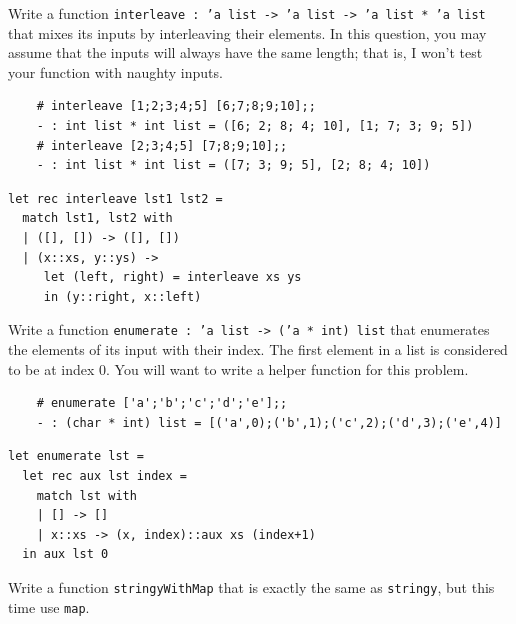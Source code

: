 \documentclass[addpoints]{exam}
\begin{document}
\begin{questions}
  
  \question
  Write a function 
  \texttt{interleave : 'a list -> 'a list -> 'a list * 'a list} 
  that mixes its inputs by interleaving their elements.
  In this question, you may assume that the inputs will always have the same length;
  that is, I won't test your function with naughty inputs.
  \begin{verbatim}
    # interleave [1;2;3;4;5] [6;7;8;9;10];;                                   
    - : int list * int list = ([6; 2; 8; 4; 10], [1; 7; 3; 9; 5])
    # interleave [2;3;4;5] [7;8;9;10];;    
    - : int list * int list = ([7; 3; 9; 5], [2; 8; 4; 10])
  \end{verbatim}

  \begin{solutionbox}{4cm}
    \begin{verbatim}
let rec interleave lst1 lst2 =
  match lst1, lst2 with
  | ([], []) -> ([], [])
  | (x::xs, y::ys) ->
     let (left, right) = interleave xs ys
     in (y::right, x::left)
    \end{verbatim}
  \end{solutionbox}

  
  \question
  Write a function 
  \texttt{enumerate : 'a list -> ('a * int) list} 
  that enumerates the elements of its input with their index.
  The first element in a list is considered to be at index 0.
  You will want to write a helper function for this problem.
  \begin{verbatim}
    # enumerate ['a';'b';'c';'d';'e'];;
    - : (char * int) list = [('a',0);('b',1);('c',2);('d',3);('e',4)]
  \end{verbatim}

  \begin{solutionbox}{4cm}
    \begin{verbatim}
let enumerate lst =
  let rec aux lst index =
    match lst with
    | [] -> []
    | x::xs -> (x, index)::aux xs (index+1)
  in aux lst 0
    \end{verbatim}
  \end{solutionbox}

  
  \vspace{1em}
  \vspace{1em}

  \question 
  Write a function \texttt{stringyWithMap}
  that is exactly the same as \texttt{stringy},
  but this time use \texttt{map}.


\end{questions}
\end{document}
